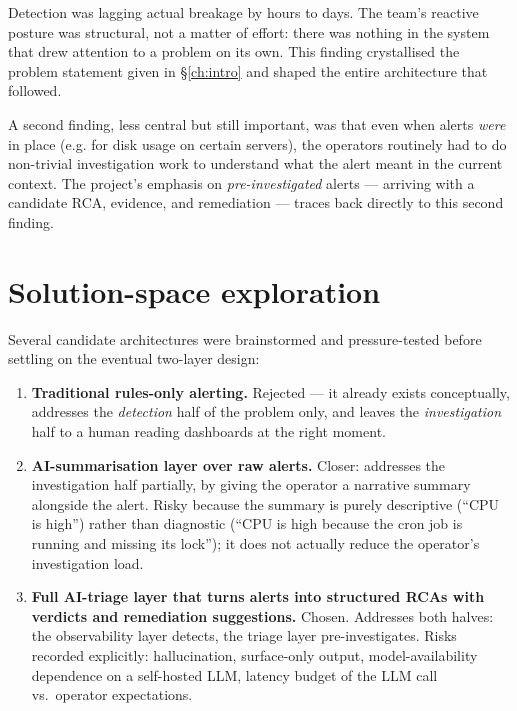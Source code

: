 \documentclass[11pt,a4paper,oneside]{report}
\begin{document}
Detection was lagging actual breakage by hours to days.  The team's
reactive posture was structural, not a matter of effort: there was
nothing in the system that drew attention to a problem on its own.
This finding crystallised the problem statement given in
\S\ref{ch:intro} and shaped the entire architecture that followed.

A second finding, less central but still important, was that even
when alerts \emph{were} in place (e.g. for disk usage on certain
servers), the operators routinely had to do non-trivial investigation
work to understand what the alert meant in the current context.  The
project's emphasis on \emph{pre-investigated} alerts --- arriving
with a candidate RCA, evidence, and remediation --- traces back
directly to this second finding.

\section{Solution-space exploration}

Several candidate architectures were brainstormed and pressure-tested
before settling on the eventual two-layer design:

\begin{enumerate}
  \item \textbf{Traditional rules-only alerting.}  Rejected --- it
        already exists conceptually, addresses the
        \emph{detection} half of the problem only, and leaves the
        \emph{investigation} half to a human reading dashboards at the
        right moment.
  \item \textbf{AI-summarisation layer over raw alerts.}  Closer:
        addresses the investigation half partially, by giving the
        operator a narrative summary alongside the alert.  Risky
        because the summary is purely descriptive (``CPU is high'')
        rather than diagnostic (``CPU is high because the cron job is
        running and missing its lock''); it does not actually reduce
        the operator's investigation load.
  \item \textbf{Full AI-triage layer that turns alerts into structured
        RCAs with verdicts and remediation suggestions.}  Chosen.
        Addresses both halves: the observability layer detects, the
        triage layer pre-investigates.  Risks recorded explicitly:
        hallucination, surface-only output, model-availability
        dependence on a self-hosted LLM, latency budget of the LLM
        call vs.\ operator expectations.
\end{enumerate}
\end{document}
